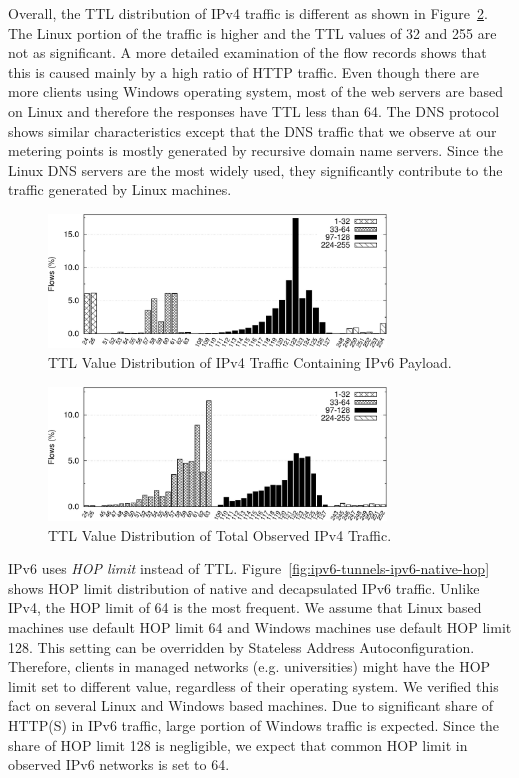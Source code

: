 Overall, the TTL distribution of IPv4 traffic is different as shown in Figure~\ref{fig:ipv6-tunnels-ipv4-ttl4}. The Linux portion of the traffic is higher and the TTL values of 32 and 255 are not as significant. A more detailed examination of the flow records shows that this is caused mainly by a high ratio of HTTP traffic. Even though there are more clients using Windows operating system, most of the web servers are based on Linux and therefore the responses have TTL less than 64. The DNS protocol shows similar characteristics except that the DNS traffic that we observe at our metering points is mostly generated by recursive domain name servers. Since the Linux DNS servers are the most widely used, they significantly contribute to the traffic generated by Linux machines.

\begin{figure}[tb]
    \centering
    \includegraphics[width=0.8\textwidth]{figures/paper-tunnels/ttl/ttl}
    \caption{TTL Value Distribution of IPv4 Traffic Containing IPv6 Payload.}
    \label{fig:ipv6-tunnels-ipv4-ttl}
\end{figure}

\begin{figure}[tb]
    \centering
    \includegraphics[width=0.8\textwidth]{figures/paper-tunnels/ttl/ttl4}
    \caption{TTL Value Distribution of Total Observed IPv4 Traffic.}
    \label{fig:ipv6-tunnels-ipv4-ttl4}
\end{figure}

IPv6 uses \textit{HOP limit} instead of TTL. Figure~\ref{fig:ipv6-tunnels-ipv6-native-hop} shows HOP limit distribution of native and decapsulated IPv6 traffic. Unlike IPv4, the HOP limit of 64 is the most frequent. We assume that Linux based machines use default HOP limit 64 and Windows machines use default HOP limit 128. This setting can be overridden by Stateless Address Autoconfiguration. Therefore, clients in managed networks (e.g. universities) might have the HOP limit set to different value, regardless of their operating system. We verified this fact on several Linux and Windows based machines. Due to significant share of HTTP(S) in IPv6 traffic, large portion of Windows traffic is expected. Since the share of HOP limit 128 is negligible, we expect that common HOP limit in observed IPv6 networks is set to 64.

